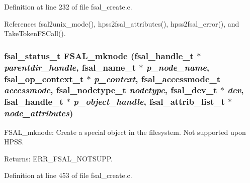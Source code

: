 Definition at line 232 of file fsal\_\-create.c.

References fsal2unix\_\-mode(), hpss2fsal\_\-attributes(), hpss2fsal\_\-error(), and Take\-Token\-FSCall().
\subsubsection{\setlength{\rightskip}{0pt plus 5cm}fsal\_\-status\_\-t FSAL\_\-mknode (fsal\_\-handle\_\-t $\ast$ {\em parentdir\_\-handle}, fsal\_\-name\_\-t $\ast$ {\em p\_\-node\_\-name}, fsal\_\-op\_\-context\_\-t $\ast$ {\em p\_\-context}, fsal\_\-accessmode\_\-t {\em accessmode}, fsal\_\-nodetype\_\-t {\em nodetype}, fsal\_\-dev\_\-t $\ast$ {\em dev}, fsal\_\-handle\_\-t $\ast$ {\em p\_\-object\_\-handle}, fsal\_\-attrib\_\-list\_\-t $\ast$ {\em node\_\-attributes})}\label{fsal__create_8c_a3}


FSAL\_\-mknode: Create a special object in the filesystem. Not supported upon HPSS.

\begin{Desc}
\item[Returns:]ERR\_\-FSAL\_\-NOTSUPP. \end{Desc}


Definition at line 453 of file fsal\_\-create.c.